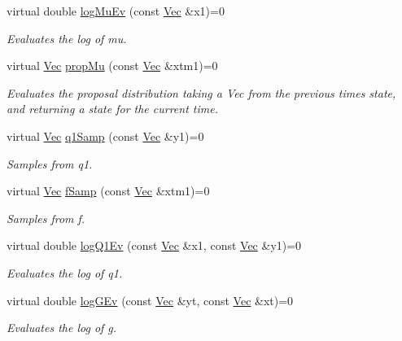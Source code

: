 \begin{DoxyCompactItemize}
virtual double \hyperlink{classAPFFilter_af3d1501c147477ce1128b221f7b608fd}{log\+Mu\+Ev} (const \hyperlink{pmfs_8h_a4c7df05c6f5e8a0d15ae14bcdbc07152}{Vec} \&x1)=0
\begin{DoxyCompactList}\small\item\em Evaluates the log of mu. \end{DoxyCompactList}\item 
virtual \hyperlink{pmfs_8h_a4c7df05c6f5e8a0d15ae14bcdbc07152}{Vec} \hyperlink{classAPFFilter_a2c136104f4d96e6481406ef1397ead51}{prop\+Mu} (const \hyperlink{pmfs_8h_a4c7df05c6f5e8a0d15ae14bcdbc07152}{Vec} \&xtm1)=0
\begin{DoxyCompactList}\small\item\em Evaluates the proposal distribution taking a Vec from the previous time\textquotesingle{}s state, and returning a state for the current time. \end{DoxyCompactList}\item 
virtual \hyperlink{pmfs_8h_a4c7df05c6f5e8a0d15ae14bcdbc07152}{Vec} \hyperlink{classAPFFilter_a017be49a493263156ae60ccc424f7daa}{q1\+Samp} (const \hyperlink{pmfs_8h_a4c7df05c6f5e8a0d15ae14bcdbc07152}{Vec} \&y1)=0
\begin{DoxyCompactList}\small\item\em Samples from q1. \end{DoxyCompactList}\item 
virtual \hyperlink{pmfs_8h_a4c7df05c6f5e8a0d15ae14bcdbc07152}{Vec} \hyperlink{classAPFFilter_a367c77209129a84f3d64ff3bcaaac513}{f\+Samp} (const \hyperlink{pmfs_8h_a4c7df05c6f5e8a0d15ae14bcdbc07152}{Vec} \&xtm1)=0
\begin{DoxyCompactList}\small\item\em Samples from f. \end{DoxyCompactList}\item 
virtual double \hyperlink{classAPFFilter_a18ba363183c0c92e6c58d6f3faccbea7}{log\+Q1\+Ev} (const \hyperlink{pmfs_8h_a4c7df05c6f5e8a0d15ae14bcdbc07152}{Vec} \&x1, const \hyperlink{pmfs_8h_a4c7df05c6f5e8a0d15ae14bcdbc07152}{Vec} \&y1)=0
\begin{DoxyCompactList}\small\item\em Evaluates the log of q1. \end{DoxyCompactList}\item 
virtual double \hyperlink{classAPFFilter_ac2d0b5329d7ae123ae4de5dddefb5591}{log\+G\+Ev} (const \hyperlink{pmfs_8h_a4c7df05c6f5e8a0d15ae14bcdbc07152}{Vec} \&yt, const \hyperlink{pmfs_8h_a4c7df05c6f5e8a0d15ae14bcdbc07152}{Vec} \&xt)=0
\begin{DoxyCompactList}\small\item\em Evaluates the log of g. \end{DoxyCompactList}\end{DoxyCompactItemize}


